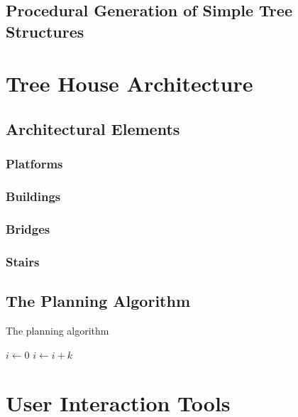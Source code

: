 \documentclass{article}
\begin{document}
\subsection{Procedural Generation of Simple Tree Structures}

\section{Tree House Architecture}

\subsection{Architectural Elements} 


\subsubsection{Platforms}

\subsubsection{Buildings}

\subsubsection{Bridges}

\subsubsection{Stairs}

\subsection{The Planning Algorithm}
 
\begin{algorithm}
\caption{The planning algorithm}
\begin{algorithmic}
        \STATE $i\gets 0$
\ELSE
                \STATE $i\gets i+k$
        \ENDIF
\ENDIF 
\end{algorithmic}

\end{algorithm}


\section{User Interaction Tools}
\end{document}
